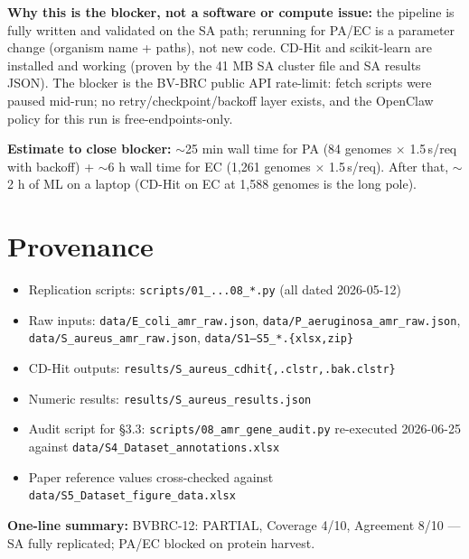 \documentclass[11pt]{article}
\begin{document}
\textbf{Why this is the blocker, not a software or compute issue:} the pipeline is fully written and validated on the SA path; rerunning for PA/EC is a parameter change (organism name + paths), not new code. CD-Hit and scikit-learn are installed and working (proven by the 41 MB SA cluster file and SA results JSON). The blocker is the BV-BRC public API rate-limit: fetch scripts were paused mid-run; no retry/checkpoint/backoff layer exists, and the OpenClaw policy for this run is free-endpoints-only.

\textbf{Estimate to close blocker:} $\sim$25 min wall time for PA (84 genomes $\times$ 1.5\,s/req with backoff) + $\sim$6 h wall time for EC (1{,}261 genomes $\times$ 1.5\,s/req). After that, $\sim$2 h of ML on a laptop (CD-Hit on EC at 1{,}588 genomes is the long pole).

\section{Provenance}
\begin{itemize}
  \item Replication scripts: \texttt{scripts/01\_...08\_*.py} (all dated 2026-05-12)
  \item Raw inputs: \texttt{data/E\_coli\_amr\_raw.json}, \texttt{data/P\_aeruginosa\_amr\_raw.json}, \texttt{data/S\_aureus\_amr\_raw.json}, \texttt{data/S1--S5\_*.\{xlsx,zip\}}
  \item CD-Hit outputs: \texttt{results/S\_aureus\_cdhit\{,.clstr,.bak.clstr\}}
  \item Numeric results: \texttt{results/S\_aureus\_results.json}
  \item Audit script for \S3.3: \texttt{scripts/08\_amr\_gene\_audit.py} re-executed 2026-06-25 against \texttt{data/S4\_Dataset\_annotations.xlsx}
  \item Paper reference values cross-checked against \texttt{data/S5\_Dataset\_figure\_data.xlsx}
\end{itemize}

\vspace{1em}
\noindent\textbf{One-line summary:} BVBRC-12: PARTIAL, Coverage 4/10, Agreement 8/10 --- SA fully replicated; PA/EC blocked on protein harvest.
\end{document}
